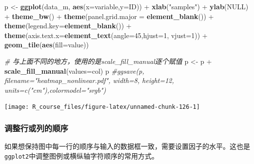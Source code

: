 \documentclass[]{article}
\newenvironment{Shaded}{\begin{snugshade}}{\end{snugshade}}
\newcommand{\KeywordTok}[1]{\textcolor[rgb]{0.13,0.29,0.53}{\textbf{{#1}}}}
\newcommand{\DataTypeTok}[1]{\textcolor[rgb]{0.13,0.29,0.53}{{#1}}}
\newcommand{\DecValTok}[1]{\textcolor[rgb]{0.00,0.00,0.81}{{#1}}}
\newcommand{\StringTok}[1]{\textcolor[rgb]{0.31,0.60,0.02}{{#1}}}
\newcommand{\CommentTok}[1]{\textcolor[rgb]{0.56,0.35,0.01}{\textit{{#1}}}}
\newcommand{\OtherTok}[1]{\textcolor[rgb]{0.56,0.35,0.01}{{#1}}}
\newcommand{\NormalTok}[1]{{#1}}
\numberwithin{figure}{section}
\numberwithin{table}{section}
\theoremstyle{definition}
\theoremstyle{definition}
\theoremstyle{definition}
\theoremstyle{remark}
\begin{document}
\begin{Shaded}
\begin{Highlighting}[]
\NormalTok{p <-}\StringTok{ }\KeywordTok{ggplot}\NormalTok{(data_m, }\KeywordTok{aes}\NormalTok{(}\DataTypeTok{x=}\NormalTok{variable,}\DataTypeTok{y=}\NormalTok{ID)) +}\StringTok{ }\KeywordTok{xlab}\NormalTok{(}\StringTok{"samples"}\NormalTok{) +}\StringTok{ }\KeywordTok{ylab}\NormalTok{(}\OtherTok{NULL}\NormalTok{) +}\StringTok{ }\KeywordTok{theme_bw}\NormalTok{() +}\StringTok{ }
\StringTok{    }\KeywordTok{theme}\NormalTok{(}\DataTypeTok{panel.grid.major =} \KeywordTok{element_blank}\NormalTok{()) +}\StringTok{ }\KeywordTok{theme}\NormalTok{(}\DataTypeTok{legend.key=}\KeywordTok{element_blank}\NormalTok{()) +}\StringTok{ }
\StringTok{    }\KeywordTok{theme}\NormalTok{(}\DataTypeTok{axis.text.x=}\KeywordTok{element_text}\NormalTok{(}\DataTypeTok{angle=}\DecValTok{45}\NormalTok{,}\DataTypeTok{hjust=}\DecValTok{1}\NormalTok{, }\DataTypeTok{vjust=}\DecValTok{1}\NormalTok{)) +}\StringTok{ }\KeywordTok{geom_tile}\NormalTok{(}\KeywordTok{aes}\NormalTok{(}\DataTypeTok{fill=}\NormalTok{value))}

\CommentTok{# 与上面不同的地方，使用的是scale_fill_manual逐个赋值}
\NormalTok{p <-}\StringTok{ }\NormalTok{p +}\StringTok{ }\KeywordTok{scale_fill_manual}\NormalTok{(}\DataTypeTok{values=}\NormalTok{col)}
\NormalTok{p}
\CommentTok{#ggsave(p, filename="heatmap_nonlinear.pdf", width=8, height=12, units=c("cm"),colormodel="srgb")}
\end{Highlighting}
\end{Shaded}

\begin{center}\texttt{[image: R\_course\_files/figure-latex/unnamed-chunk-126-1]} \end{center}

\subsubsection{调整行或列的顺序}

如果想保持图中每一行的顺序与输入的数据框一致，需要设置因子的水平。这也是\texttt{ggplot2}中调整图例或横纵轴字符顺序的常用方式。
\end{document}
